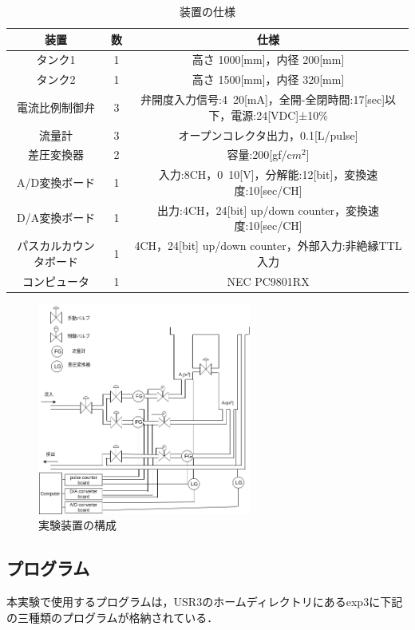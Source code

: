 \documentclass[12pt]{jsarticle}
\begin{document}
\begin{table}[tb]
  \label{TableB1-2}
  \caption{装置の仕様}
  \begin{tabular}{c|c|c} \hline
    装置 & 数 & 仕様\\ \hline \hline
    タンク1 & 1 & 高さ 1000[mm]，内径 200[mm] \\ \hline
    タンク2 & 1 & 高さ 1500[mm]，内径 320[mm] \\ \hline
    電流比例制御弁 & 3 & 弁開度入力信号:4~20[mA]，全開-全閉時間:17[sec]以下，電源:24[VDC]±10\% \\ \hline
    流量計 & 3 & オープンコレクタ出力，0.1[L/pulse] \\ \hline
    差圧変換器 & 2 & 容量:200[gf/c$m^2$] \\ \hline
    A/D変換ボード & 1 & 入力:8CH，0~10[V]，分解能:12[bit]，変換速度:10[sec/CH] \\ \hline
    D/A変換ボード & 1 & 出力:4CH，24[bit] up/down counter，変換速度:10[sec/CH] \\ \hline
    パスカルカウンタボード & 1 & 4CH，24[bit] up/down counter，外部入力:非絶縁TTL入力 \\ \hline
    コンピュータ & 1 & NEC PC9801RX \\ \hline
  \end{tabular}
\end{table}
\begin{figure}[tb]
  \begin{center}
    \includegraphics[clip,width=7.0cm]{../img/FigB1_2.png}
    \caption{実験装置の構成}
    \label{FigB1-2}
  \end{center}
\end{figure}
\subsection{プログラム}
本実験で使用するプログラムは，USR3のホームディレクトリにあるexp3に下記の三種類のプログラムが格納されている．
\end{document}
